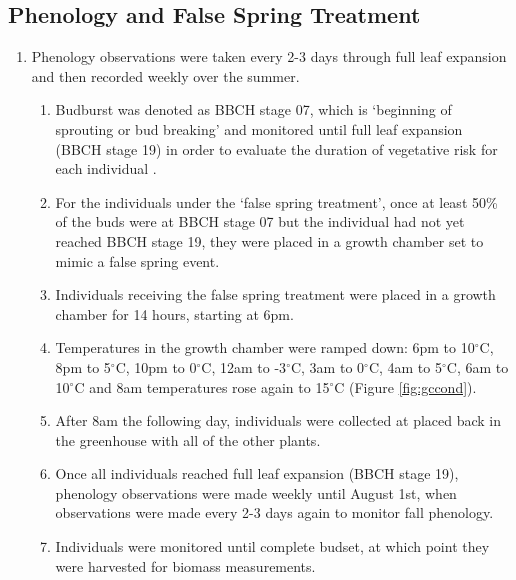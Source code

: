 \documentclass{article}\usepackage[]{graphicx}\usepackage[]{color}
\begin{document}
\subsection*{Phenology and False Spring Treatment}
\begin{enumerate}
\item Phenology observations were taken every 2-3 days through full leaf expansion and then recorded weekly over the summer.
  \begin{enumerate}
  \item Budburst was denoted as BBCH stage 07, which is `beginning of sprouting or bud breaking' and monitored until full leaf expansion (BBCH stage 19) in order to evaluate the duration of vegetative risk for each individual \citep{Finn2007}.
  \item For the individuals under the `false spring treatment', once at least 50\% of the buds were at BBCH stage 07 but the individual had not yet reached BBCH stage 19, they were placed in a growth chamber set to mimic a false spring event.
  \item Individuals receiving the false spring treatment were placed in a growth chamber for 14 hours, starting at 6pm. 
  \item Temperatures in the growth chamber were ramped down: 6pm to 10$^{\circ}$C, 8pm to 5$^{\circ}$C, 10pm to 0$^{\circ}$C, 12am to -3$^{\circ}$C, 3am to 0$^{\circ}$C, 4am to 5$^{\circ}$C, 6am to 10$^{\circ}$C and 8am temperatures rose again to 15$^{\circ}$C (Figure \ref{fig:gccond}).
  \item After 8am the following day, individuals were collected at placed back in the greenhouse with all of the other plants. 
  \item Once all individuals reached full leaf expansion (BBCH stage 19), phenology observations were made weekly until August 1st, when observations were made every 2-3 days again to monitor fall phenology. 
  \item Individuals were monitored until complete budset, at which point they were harvested for biomass measurements.
  \end{enumerate}
\end{enumerate}
\end{document}
